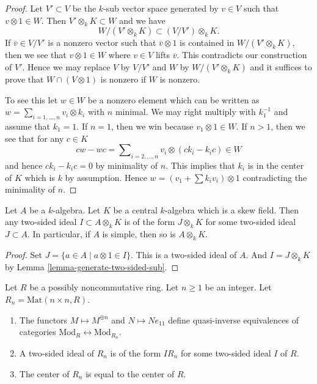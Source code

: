 \begin{proof}
Let $V' \subset V$ be the $k$-sub vector space generated by $v \in V$
such that $v \otimes 1 \in W$. Then $V' \otimes_k K \subset W$ and
we have
$$
W/(V' \otimes_k K)  \subset  (V/V') \otimes_k K.
$$
If $\overline{v} \in V/V'$ is a nonzero vector such that
$\overline{v} \otimes 1$ is contained in $W/(V' \otimes_k K)$,
then we see that $v \otimes 1 \in W$ where $v \in V$ lifts $\overline{v}$.
This contradicts our construction of $V'$. Hence we may replace
$V$ by $V/V'$ and $W$ by $W/(V' \otimes_k K)$ and it suffices to prove
that $W \cap (V \otimes 1)$ is nonzero if $W$ is nonzero.

\medskip\noindent
To see this let $w \in W$ be a nonzero element which can be written
as $w = \sum_{i = 1, \ldots, n} v_i \otimes k_i$ with $n$ minimal.
We may right multiply with $k_1^{-1}$ and assume that $k_1 = 1$.
If $n = 1$, then we win because $v_1 \otimes 1 \in W$.
If $n > 1$, then we see that for any $c \in K$
$$
c w - w c = \sum\nolimits_{i = 2, \ldots, n} v_i \otimes (c k_i - k_i c) \in W
$$
and hence $c k_i - k_i c = 0$ by minimality of $n$.
This implies that $k_i$ is in the center of $K$ which is $k$ by
assumption. Hence $w = (v_1 + \sum k_i v_i) \otimes 1$ contradicting
the minimality of $n$.
\end{proof}

\begin{lemma}
\label{lemma-generate-two-sided-ideal}
Let $A$ be a $k$-algebra. Let $K$ be a central $k$-algebra
which is a skew field. Then any two-sided ideal $I \subset A \otimes_k K$
is of the form $J \otimes_k K$ for some two-sided ideal $J \subset A$.
In particular, if $A$ is simple, then so is $A \otimes_k K$.
\end{lemma}

\begin{proof}
Set $J = \{a \in A \mid a \otimes 1 \in I\}$. This is a two-sided ideal
of $A$. And $I = J \otimes_k K$ by
Lemma \ref{lemma-generate-two-sided-sub}.
\end{proof}

\begin{lemma}
\label{lemma-matrix-algebras}
Let $R$ be a possibly noncommutative ring. Let $n \geq 1$ be an integer.
Let $R_n = \text{Mat}(n \times n, R)$.
\begin{enumerate}
\item The functors $M \mapsto M^{\oplus n}$ and
$N \mapsto Ne_{11}$ define quasi-inverse equivalences of categories
$\text{Mod}_R \leftrightarrow \text{Mod}_{R_n}$.
\item A two-sided ideal of $R_n$ is of the form $IR_n$ for some
two-sided ideal $I$ of $R$.
\item The center of $R_n$ is equal to the center of $R$.
\end{enumerate}
\end{lemma}


